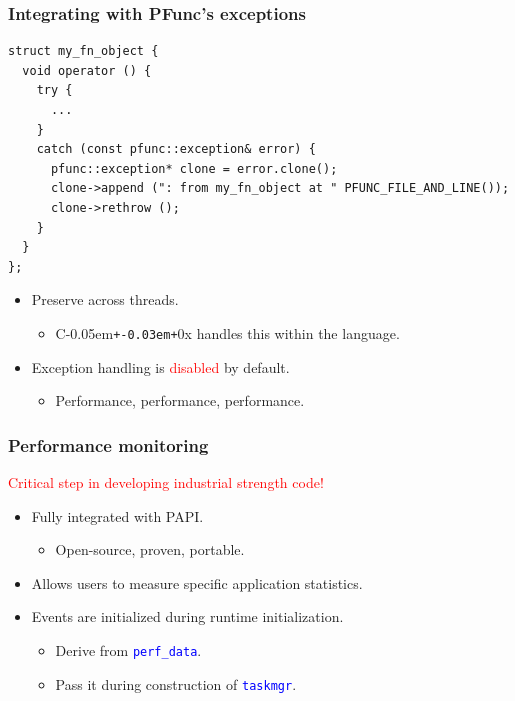 \documentclass{beamer}
\newcommand{\code}[1]{\lstinline[basicstyle=\sffamily]{#1}}
\newcommand{\Cpp}{C\kern-0.05em\texttt{+\kern-0.03em+}}
\begin{document}
\begin{frame}[fragile]
\frametitle{Integrating with PFunc's exceptions}
\begin{center}
\begin{minipage}{0.60\textwidth}
\begin{lstlisting}
struct my_fn_object { 
  void operator () { 
    try { 
      ... 
    }
    catch (const pfunc::exception& error) { 
      pfunc::exception* clone = error.clone();
      clone->append (": from my_fn_object at " PFUNC_FILE_AND_LINE()); 
      clone->rethrow ();
    } 
  }
};
\end{lstlisting}
\end{minipage}
\end{center}
\begin{itemize}
\item Preserve across threads.
  \begin{itemize}
  \item \Cpp{}0x handles this within the language.
  \end{itemize}
\item Exception handling is \textcolor{red}{disabled} by default.
  \begin{itemize}
  \item Performance, performance, performance. 
  \end{itemize}
\end{itemize}
\end{frame}

\begin{frame}
\frametitle{Performance monitoring}
\begin{center}
\textcolor{red}{Critical step in developing industrial strength code!}
\end{center}
\begin{itemize}
\item Fully integrated with PAPI.
  \begin{itemize}
  \item Open-source, proven, portable.
  \end{itemize}
\item Allows users to measure specific application statistics.
\item Events are initialized during runtime initialization.
  \begin{itemize}
  \item Derive from \textcolor{blue}{\code{perf_data}}.
  \item Pass it during construction of \textcolor{blue}{\code{taskmgr}}.
  \end{itemize}
\end{itemize}
\end{frame}
\end{document}
